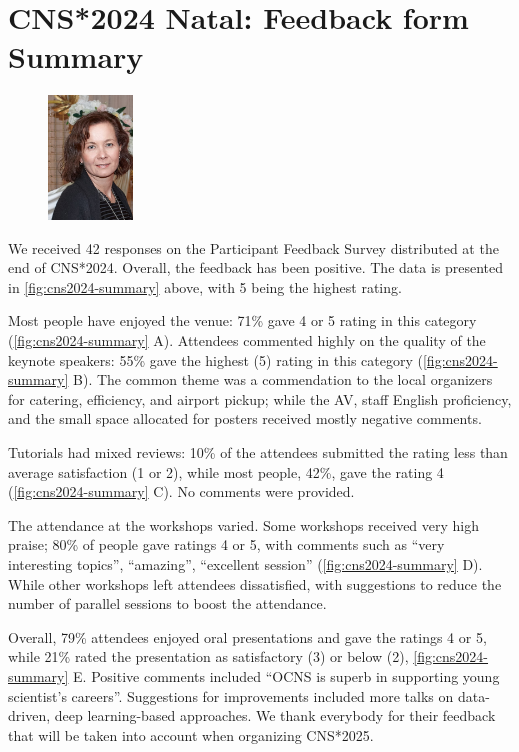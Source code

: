 \documentclass[11pt,a4paper,oneside]{article}
\begin{document}
\clearpage


\clearpage
\section*{CNS*2024 Natal: Feedback form Summary}%
\begin{figure}
  \includegraphics[width=0.2\textwidth]{images/Kameneva}
\end{figure}

We received 42 responses on the Participant Feedback Survey distributed at the end of CNS*2024.
Overall, the feedback has been positive. The data is presented in \cref{fig:cns2024-summary} above, with 5 being the highest rating.

Most people have enjoyed the venue: 71\% gave 4 or 5 rating in this category (\cref{fig:cns2024-summary} A).
Attendees commented highly on the quality of the keynote speakers: 55\% gave the highest (5) rating in this category (\cref{fig:cns2024-summary} B).
The common theme was a commendation to the local organizers for catering, efficiency, and airport pickup; while the AV, staff English proficiency, and the small space allocated for posters received mostly negative comments.

Tutorials had mixed reviews: 10\% of the attendees submitted the rating less than average satisfaction (1 or 2), while most people, 42\%, gave the rating 4 (\cref{fig:cns2024-summary} C). No comments were provided.

The attendance at the workshops varied.
Some workshops received very high praise; 80\% of people gave ratings 4 or 5, with comments such as \enquote{very interesting topics}, \enquote{amazing}, \enquote{excellent session} (\cref{fig:cns2024-summary} D).
While other workshops left attendees dissatisfied, with suggestions to reduce the number of parallel sessions to boost the attendance.

Overall, 79\% attendees enjoyed oral presentations and gave the ratings 4 or 5, while 21\% rated the presentation as satisfactory (3) or below (2), \cref{fig:cns2024-summary} E.
Positive comments included \enquote{OCNS is superb in supporting young scientist's careers}.
Suggestions for improvements included more talks on data-driven, deep learning-based approaches.
We thank everybody for their feedback that will be taken into account when organizing CNS*2025.
\end{document}
